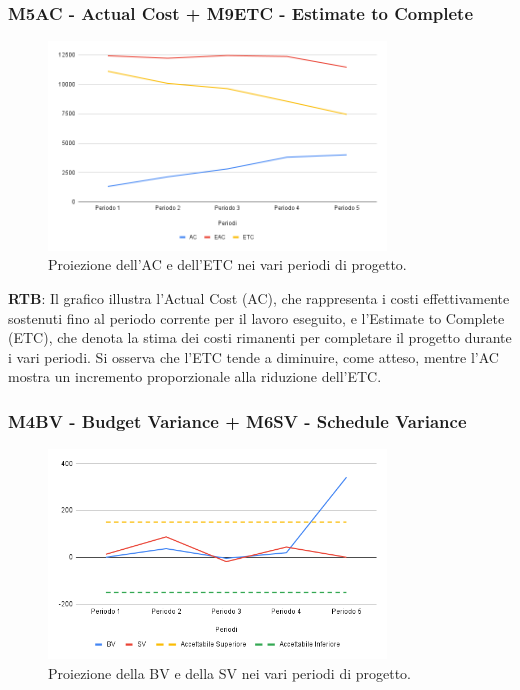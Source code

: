 \subsubsection{M5AC - Actual Cost + M9ETC - Estimate to Complete}
\begin{figure}[H]
    \centering
    \includegraphics[width=0.8\textwidth]{../Images/PianoDiQualifica/AC_ETC.png}
    \caption{Proiezione dell’AC e dell’ETC nei vari periodi di progetto.}
    \label{fig:4}
\end{figure}

\textbf{RTB}: Il grafico illustra l'Actual Cost (AC), che rappresenta i costi effettivamente sostenuti fino al periodo corrente per il lavoro eseguito, e l'Estimate to Complete (ETC), che denota la stima dei costi rimanenti per completare il progetto durante i vari periodi. Si osserva che l'ETC tende a diminuire, come atteso, mentre l'AC mostra un incremento proporzionale alla riduzione dell'ETC.

\subsubsection{M4BV - Budget Variance + M6SV - Schedule Variance}
\begin{figure}[H]
    \centering
    \includegraphics[width=0.8\textwidth]{../Images/PianoDiQualifica/BV_SV.png}
    \caption{Proiezione della BV e della SV nei vari periodi di progetto.}
    \label{fig:5}
\end{figure}

